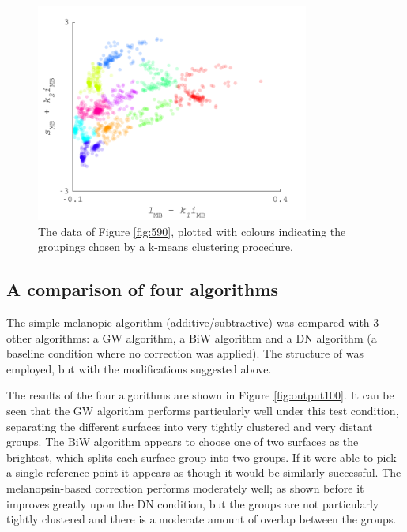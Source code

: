 \begin{figure}[htbp]
 \includegraphics[max width=0.8\textwidth]{figs/comp/KMeansMarkDemo/2.pdf}
 \caption{The data of Figure \ref{fig:590}, plotted with colours indicating the groupings chosen by a k-means clustering procedure.}
 \label{fig:KM2}
\end{figure} 


\subsection{A comparison of four algorithms}

The simple melanopic algorithm (additive/subtractive) was compared with 3 other algorithms: a \gls{GW} algorithm, a \gls{BiW} algorithm and a \gls{DN} algorithm (a baseline condition where no correction was applied). The structure of \citet{barnard_comparison_2002} was employed, but with the modifications suggested above. %


The results of the four algorithms are shown in Figure \ref{fig:output100}. It can be seen that the \gls{GW} algorithm performs particularly well under this test condition, separating the different surfaces into very tightly clustered and very distant groups. The \gls{BiW} algorithm appears to choose one of two surfaces as the brightest, which splits each surface group into two groups. If it were able to pick a single reference point it appears as though it would be similarly successful. The melanopsin-based correction performs moderately well; as shown before it improves greatly upon the \gls{DN} condition, but the groups are not particularly tightly clustered and there is a moderate amount of overlap between the groups.

